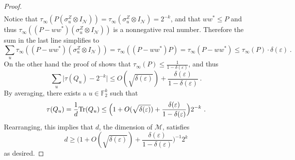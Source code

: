 \documentclass[11pt]{article}
\theoremstyle{definition}
\newcommand{\Tr}{\mbox{\rm Tr}}
\newcommand{\F}{\ensuremath{\mathbb{F}}}
\newcommand{\mM}{\ensuremath{\mathcal{M}}}
\newcommand{\eps}{\varepsilon}
\newcommand{\mN}{\mathcal{N}}
\begin{document}
\begin{proof}
\begin{align*}
\end{align*}
Notice that $\tau_\infty (P (\sigma^Z_u \otimes I_\mN)) = \tau_\infty (\sigma^Z_u \otimes I_\mN) = 2^{-k}$, and that $ww^* \leq P$ and thus $\tau_\infty((P - ww^*)(\sigma^Z_u \otimes I_\mN))$ is a nonnegative real number. Therefore the sum in the last line simplifies to
\[
\sum_u \tau_\infty((P - ww^*)(\sigma^Z_u \otimes I_\mN)) = \tau_\infty((P - ww^*) P) = \tau_\infty(P - ww^*) \leq \tau_\infty(P) \cdot \delta(\eps)~.
\]
On the other hand the proof of  shows that $\tau_\infty(P) \leq \frac{1}{1 - \delta(\eps)}$, and thus 
\[
\sum_u \Big| \tau(Q_u) - 2^{-k} \Big| \leq O(\sqrt{\delta(\eps)}) + \frac{\delta(\eps)}{1 - \delta(\eps)}~.
\]
By averaging, there exists a $u \in \F_2^k$ such that
\[
\tau(Q_u) = \frac{1}{d} \Tr(Q_u) \leq  \Big( 1 + O(\sqrt{\delta(\eps)}) + \frac{\delta(\eps)}{1 - \delta(\eps)}\Big) 2^{-k}~.
\]
Rearranging, this implies that $d$, the dimension of $\mM$, satisfies
\[
	d \geq \Big( 1 + O(\sqrt{\delta(\eps)}) + \frac{\delta(\eps)}{1 - \delta(\eps)}\Big)^{-1} 2^k
\]
as desired.
\end{proof}






\notesendofpaper
\end{document}
